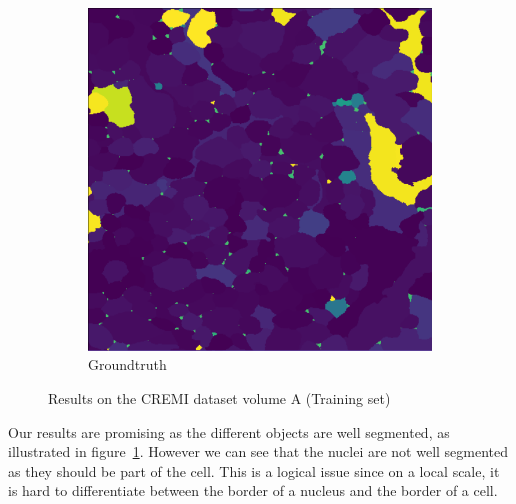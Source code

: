 \begin{figure}[!htbp]
\begin{subfigure}[t]{0.31\textwidth}
        \includegraphics[height=0.7\textwidth]{./images/cremi_gt_1.png}
        \caption{Groundtruth}
    \end{subfigure}
	\caption{Results on the CREMI dataset volume A (Training set)}
	\label{fig:cremi_results_a}
\end{figure}

Our results are promising as the different objects are well segmented, as
illustrated in figure~\ref{fig:cremi_results_a}. 
However we can see that the nuclei are not well segmented as they should be
part of the cell. This is a logical issue since on a local scale, it is hard to
differentiate between the border of a nucleus and the border of a cell.\\

